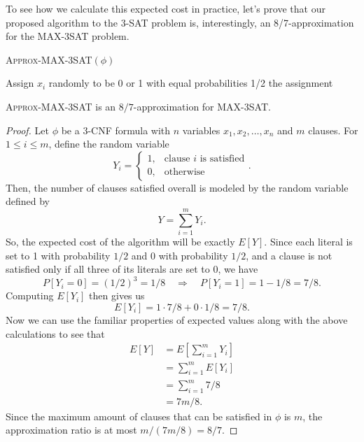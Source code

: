 \documentclass{article}
\newenvironment{theorem}[2][Theorem]{\begin{trivlist}
\item[\hskip \labelsep {\bfseries #1}\hskip \labelsep {\bfseries #2.}]}{\end{trivlist}}
\begin{document}
\noindent To see how we calculate this expected cost in practice, let's prove that our proposed algorithm to the 3-SAT problem is, interestingly, an 8/7-approximation for the MAX-3SAT problem.

\begin{algorithm}
    \renewcommand{\thealgorithm}{}
    \caption{\textsc{Approx-MAX-3SAT}$(\phi)$}
    \begin{algorithmic}
            \State Assign $x_i$ randomly to be 0 or 1 with equal probabilities 1/2
        \EndFor
        \State \Return the assignment
    \end{algorithmic}
\end{algorithm}

\begin{theorem}{2.1}{}
    \textsc{Approx-MAX-3SAT} is an $8/7$-approximation for MAX-3SAT.

    \begin{proof}
        Let $\phi$ be a 3-CNF formula with $n$ variables $x_1,x_2,\dots,x_n$ and $m$ clauses. For $1 \leq i \leq m$, define the random variable
        \[
        Y_i =
        \begin{cases}
            1, &\text{clause $i$ is satisfied}\\
            0, &\text{otherwise}
        \end{cases}.
        \]
        Then, the number of clauses satisfied overall is modeled by the random variable defined by
        \[
        Y = \sum_{i=1}^m Y_i.
        \]
        So, the expected cost of the algorithm will be exactly $E[Y]$. Since each literal is set to 1 with probability $1/2$ and 0 with probability $1/2$, and a clause is not satisfied only if all three of its literals are set to 0, we have
        \[
        P[Y_i = 0] = (1/2)^3 = 1/8 \quad \Longrightarrow \quad P[Y_i = 1] = 1 - 1/8 = 7/8.
        \]
        Computing $E[Y_i]$ then gives us
        \[
        E[Y_i] = 1 \cdot 7/8 + 0 \cdot 1/8 = 7/8.
        \]
        Now we can use the familiar properties of expected values along with the above calculations to see that
        \begin{align*}
            E[Y] &= E \left[ \sum_{i=1}^m Y_i \right]\\
            &= \sum_{i=1}^{m} E[Y_i]\\
            &= \sum_{i=1}^{m} 7/8\\
            &= 7m/8.
        \end{align*}
        Since the maximum amount of clauses that can be satisfied in $\phi$ is $m$, the approximation ratio is at most $m/(7m/8) = 8/7$.
    \end{proof}
\end{theorem}
\end{document}
